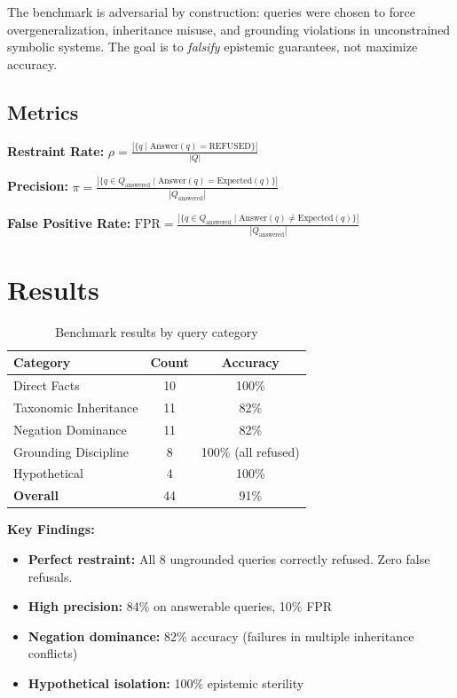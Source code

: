 \documentclass[11pt]{article}
\begin{document}
The benchmark is adversarial by construction: queries were chosen to force overgeneralization, inheritance misuse, and grounding violations in unconstrained symbolic systems. The goal is to \emph{falsify} epistemic guarantees, not maximize accuracy.

\subsection{Metrics}

\textbf{Restraint Rate:} $\rho = \frac{|\{q \mid \text{Answer}(q) = \text{REFUSED}\}|}{|Q|}$

\textbf{Precision:} $\pi = \frac{|\{q \in Q_{\text{answered}} \mid \text{Answer}(q) = \text{Expected}(q)\}|}{|Q_{\text{answered}}|}$

\textbf{False Positive Rate:} $\text{FPR} = \frac{|\{q \in Q_{\text{answered}} \mid \text{Answer}(q) \neq \text{Expected}(q)\}|}{|Q_{\text{answered}}|}$

\section{Results}

\begin{table}[h]
\centering
\begin{tabular}{@{}lcc@{}}
\toprule
\textbf{Category} & \textbf{Count} & \textbf{Accuracy} \\ \midrule
Direct Facts & 10 & 100\% \\
Taxonomic Inheritance & 11 & 82\% \\
Negation Dominance & 11 & 82\% \\
Grounding Discipline & 8 & 100\% (all refused) \\
Hypothetical & 4 & 100\% \\ \midrule
\textbf{Overall} & 44 & 91\% \\
\bottomrule
\end{tabular}
\caption{Benchmark results by query category}
\label{tab:results}
\end{table}

\textbf{Key Findings:}

\begin{itemize}
    \item \textbf{Perfect restraint:} All 8 ungrounded queries correctly refused. Zero false refusals.
    \item \textbf{High precision:} 84\% on answerable queries, 10\% FPR
    \item \textbf{Negation dominance:} 82\% accuracy (failures in multiple inheritance conflicts)
    \item \textbf{Hypothetical isolation:} 100\% epistemic sterility
\end{itemize}
\end{document}
